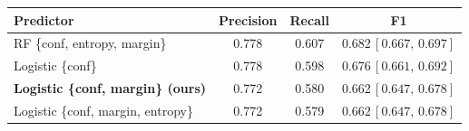 \begin{tabular}{lccc}
\toprule
Predictor & Precision & Recall & F1 \\
\midrule
RF \{conf, entropy, margin\} & 0.778 & 0.607 & 0.682\,{\scriptsize$[0.667,\,0.697]$} \\
Logistic \{conf\} & 0.778 & 0.598 & 0.676\,{\scriptsize$[0.661,\,0.692]$} \\
\textbf{Logistic \{conf, margin\} (ours)} & 0.772 & 0.580 & 0.662\,{\scriptsize$[0.647,\,0.678]$} \\
Logistic \{conf, margin, entropy\} & 0.772 & 0.579 & 0.662\,{\scriptsize$[0.647,\,0.678]$} \\
\bottomrule
\end{tabular}
